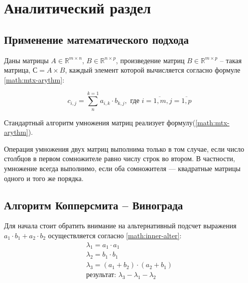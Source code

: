 \chapter{Аналитический раздел}\label{analyth}

\section{Применение математического подхода}
Даны матрицы $A \in \mathbb{R}^{m \times n}$, $B \in \mathbb{R}^{n \times p}$, произведение матриц $B \in \mathbb{R}^{m \times p}$ -- такая матрица, $С = A \times B$, каждый элемент которой вычисляется согласно формуле \ref{math:mtx-arythm}:

\begin{equation}\label{math:mtx-arythm} 
	c_{i,j} = \sum_{n}^{k = 1}a_{i, k}\cdot b_{k, j}, \text{  где } i = \overline{1, m}, j = \overline{1, p} 
\end{equation}

\noindent Стандартный алгоритм умножения матриц реализует формулу(\ref{math:mtx-arythm}). 

Операция умножения двух матриц выполнима только в том случае, если число столбцов в первом сомножителе равно числу строк во втором. В частности, умножение всегда выполнимо, если оба сомножителя — квадратные матрицы одного и того же порядка. 

\section{Алгоритм Копперсмита – Винограда}
Для начала стоит обратить внимание на альтернативный подсчет выражения $a_1 \cdot b_1 + a_2 \cdot b_2$ осуществляется согласно \ref{math:inner-alter}:
\begin{equation}\label{math:inner-alter}
	\begin{array}{llll}
		\lambda_1 = a_1 \cdot a_1 \\
		\lambda_2 = b_1 \cdot b_1 \\
		\lambda_3 = (a_1 + b_2) \cdot (a_2 + b_1) \\
		\text{результат: } \lambda_3 - \lambda_1 - \lambda_2 \\ 
	\end{array}
\end{equation}

